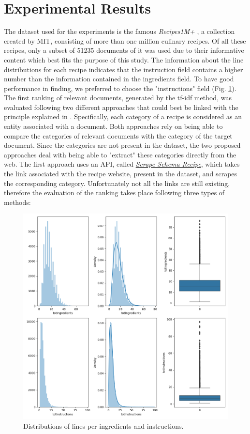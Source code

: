 \section*{Experimental Results}

The dataset used for the experiments is the famous \emph{Recipes1M+} \cite{15}, a collection 
created by MIT, consisting of more than one million culinary recipes. Of 
all these recipes, only a subset of 51235 documents of it was used due to their 
informative content which best fits the purpose of this study. The information 
about the line distributions for each recipe indicates that the instruction 
field contains a higher number than the information contained in the ingredients 
field. To have good performance in finding, we preferred to choose the 
"instructions" field (Fig. \ref{distributions}). The first ranking of relevant documents, generated 
by the tf-idf method, was evaluated following two different approaches that 
could best be linked with the principle explained in \cite{16}. Specifically, each 
category of a recipe is considered as an entity associated with a document. 
Both approaches rely on being able to compare the categories of relevant 
documents with the category of the target document. Since the categories 
are not present in the dataset, the two proposed approaches deal with being 
able to "extract" these categories directly from the web. The first approach 
uses an API, called \href{https://pypi.org/project/scrape-schema-recipe/}{\emph{Scrape Schema Recipe}}, which takes the link associated 
with the recipe website, present in the dataset, and scrapes the corresponding 
category. Unfortunately not all the links are still existing, therefore the 
evaluation of the ranking takes place following three types of methods:
\begin{figure}[h!]
    \centering
    \includegraphics[width = 0.6 \linewidth]{images/displot.png}
    \centering
    \caption{Distributions of lines per ingredients and instructions.}
    \label{distributions}
\end{figure}
